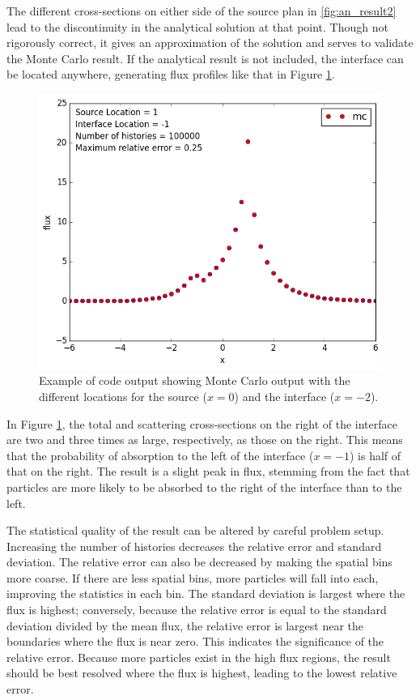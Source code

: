 \documentclass[11pt, oneside]{article}   	%
\begin{document}
The different cross-sections on either side of the source plan in \ref{fig:an_result2} lead to the discontinuity in the analytical solution at that point. Though not rigorously correct, it gives an approximation of the solution and serves to validate the Monte Carlo result. If the analytical result is not included, the interface can be located anywhere, generating flux profiles like that in Figure \ref{fig:mc_result1}.

\begin{figure}
\centering
  \includegraphics[width=12cm, keepaspectratio,]{mc_result1}
   \caption{Example of code output showing Monte Carlo output with the different locations for the source ($x = 0$) and the interface ($x=-2$).}
  \label{fig:mc_result1}
\end{figure}

In Figure \ref{fig:mc_result1}, the total and scattering cross-sections on the right of the interface are two and three times as large, respectively, as those on the right. This means that the probability of absorption to the left of the interface ($x = -1$) is half of that on the right. The result is a slight peak in flux, stemming from the fact that particles are more likely to be absorbed to the right of the interface than to the left.

The statistical quality of the result can be altered by careful problem setup. Increasing the number of histories decreases the relative error and standard deviation. The relative error can also be decreased by making the spatial bins more coarse. If there are less spatial bins, more particles will fall into each, improving the statistics in each bin. The standard deviation is largest where the flux is highest; conversely, because the relative error is equal to the standard deviation divided by the mean flux, the relative error is largest near the boundaries where the flux is near zero. This indicates the significance of the relative error. Because more particles exist in the high flux regions, the result should be best resolved where the flux is highest, leading to the lowest relative error.
\end{document}
